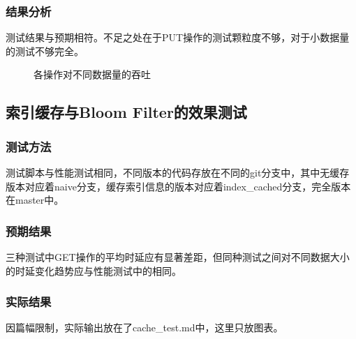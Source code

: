 \documentclass{ctexart}
\begin{document}
\subsubsection{结果分析}
测试结果与预期相符。不足之处在于PUT操作的测试颗粒度不够，对于小数据量的测试不够完全。
\begin{figure}
  \centering
  \caption{各操作对不同数据量的吞吐}
\end{figure}


\subsection{索引缓存与Bloom Filter的效果测试}

\subsubsection{测试方法}
测试脚本与性能测试相同，不同版本的代码存放在不同的git分支中，其中无缓存版本对应着naive分支，缓存索引信息的版本对应着index\_cached分支，完全版本在master中。

\subsubsection{预期结果}
三种测试中GET操作的平均时延应有显著差距，但同种测试之间对不同数据大小的时延变化趋势应与性能测试中的相同。

\subsubsection{实际结果}
因篇幅限制，实际输出放在了cache\_test.md中，这里只放图表。
\end{document}
